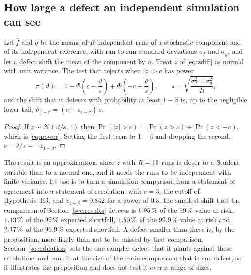 \subsection{How large a defect an independent simulation can see}

\begin{proposition}\label{prop:power}
Let $\bar f$ and $\bar g$ be the means of $R$ independent runs of a stochastic component and of its independent reference, with run-to-run standard deviations $\sigma_f$ and $\sigma_g$, and let a defect shift the mean of the component by $\vartheta$. Treat $z$ of \eqref{eq:zdiff} as normal with unit variance. The test that rejects when $|z|>c$ has power
\begin{equation}
  \pi(\vartheta)=1-\Phi\!\left(c-\frac{\vartheta}{s}\right)+\Phi\!\left(-c-\frac{\vartheta}{s}\right),\qquad s=\sqrt{\frac{\sigma_f^2+\sigma_g^2}{R}},
  \label{eq:power}
\end{equation}
and the shift that it detects with probability at least $1-\beta$ is, up to the negligible lower tail, $\vartheta_{1-\beta}=(c+z_{1-\beta})\,s$.
\end{proposition}

\begin{proof}
If $z\sim\mathcal{N}(\vartheta/s,1)$ then $\Pr(|z|>c)=\Pr(z>c)+\Pr(z<-c)$, which is \eqref{eq:power}. Setting the first term to $1-\beta$ and dropping the second, $c-\vartheta/s=-z_{1-\beta}$.
\end{proof}

The result is an approximation, since $z$ with $R=10$ runs is closer to a Student variable than to a normal one, and it needs the runs to be independent with finite variance. Its use is to turn a simulation comparison from a statement of agreement into a statement of resolution: with $c=3$, the cutoff of Hypothesis~H3, and $z_{1-\beta}=0.842$ for a power of $0.8$, the smallest shift that the comparison of Section~\ref{sec:results} detects is $0.95\,\%$ of the 99\,\% value at risk, $1.13\,\%$ of the 99\,\% expected shortfall, $1.50\,\%$ of the 99.9\,\% value at risk and $2.17\,\%$ of the 99.9\,\% expected shortfall. A defect smaller than these is, by the proposition, more likely than not to be missed by that comparison. Section~\ref{sec:ablation} sets the one sampler defect that it plants against these resolutions and runs it at the size of the main comparison; that is one defect, so it illustrates the proposition and does not test it over a range of sizes.
